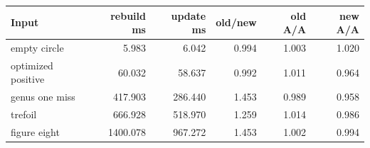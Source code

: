 \begin{center}
\small
\begin{tabular}{lrrrrr}
\toprule
Input & rebuild ms & update ms & old/new & old A/A & new A/A\\
\midrule
empty circle & 5.983 & 6.042 & 0.994 & 1.003 & 1.020\\
optimized positive & 60.032 & 58.637 & 0.992 & 1.011 & 0.964\\
genus one miss & 417.903 & 286.440 & 1.453 & 0.989 & 0.958\\
trefoil & 666.928 & 518.970 & 1.259 & 1.014 & 0.986\\
figure eight & 1400.078 & 967.272 & 1.453 & 1.002 & 0.994\\
\bottomrule
\end{tabular}
\end{center}
